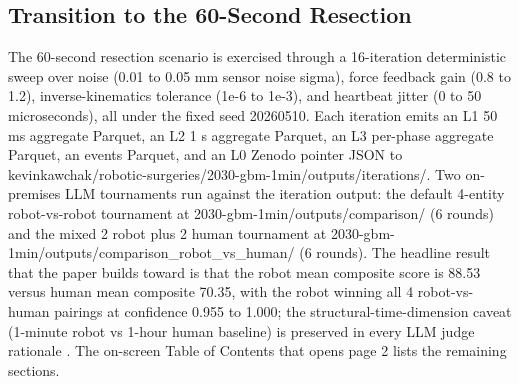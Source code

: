 \clearpage

\subsection{Transition to the 60-Second Resection}
\label{sec:intro-transition}

The 60-second resection scenario is exercised through a 16-iteration
deterministic sweep over noise (0.01 to 0.05 mm sensor noise sigma),
force feedback gain (0.8 to 1.2), inverse-kinematics tolerance
(1e-6 to 1e-3), and heartbeat jitter (0 to 50 microseconds), all
under the fixed seed 20260510. Each iteration emits an L1 50 ms
aggregate Parquet, an L2 1 s aggregate Parquet, an L3 per-phase
aggregate Parquet, an events Parquet, and an L0 Zenodo pointer JSON
to kevinkawchak/robotic-surgeries/2030-gbm-1min/outputs/iterations/.
Two on-premises LLM tournaments run against the iteration output:
the default 4-entity robot-vs-robot tournament at
2030-gbm-1min/outputs/comparison/ (6 rounds) and the mixed 2 robot
plus 2 human tournament at
2030-gbm-1min/outputs/comparison\_robot\_vs\_human/ (6 rounds). The
headline result that the paper builds toward is that the robot mean
composite score is 88.53 versus human mean composite 70.35, with the
robot winning all 4 robot-vs-human pairings at confidence 0.955 to
1.000; the structural-time-dimension caveat (1-minute robot vs
1-hour human baseline) is preserved in every LLM judge rationale
\cite{kawchak_2026_20113157, repo-robotic-surgeries}. The on-screen
Table of Contents that opens page 2 lists the remaining sections.
